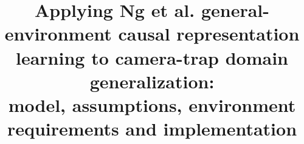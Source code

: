 \documentclass[11pt]{article}
\title{Applying Ng et al. general-environment causal representation learning
to camera-trap domain generalization:\\
model, assumptions, environment requirements and implementation}
\author{}
\date{}
\theoremstyle{definition}
\theoremstyle{remark}
\begin{document}
\maketitle
\renewcommand{\thefootnote}{\roman{footnote}} %
\makeatletter
\renewcommand{\@makefnmark}{\hbox{\@textsuperscript{\normalfont\@thefnmark}\hspace{0.3em}}}
\makeatother


\tableofcontents
\newpage













\newpage








\newpage
\appendix
{}

\newpage


\newpage


\newpage
\end{document}
